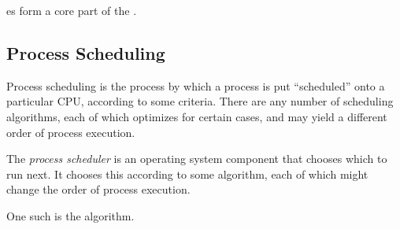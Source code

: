 es form a core part of the .

\subsection{Process Scheduling}\label{subsec:Process_Scheduling}
Process scheduling is the process by which a process is put ``scheduled'' onto a particular CPU, according to some criteria.
There are any number of scheduling algorithms, each of which optimizes for certain cases, and may yield a different order of process execution.
\begin{definition}\label{def:Process_Scheduler}
  The \emph{process scheduler} is an operating system component that chooses which  to run next.
  It chooses this according to some algorithm, each of which might change the order of process execution.
\end{definition}

One such  is the  algorithm.



